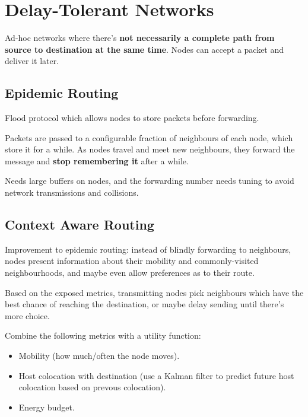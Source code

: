 \documentclass[a4paper, 11pt]{article}
\begin{document}
\section*{Delay-Tolerant Networks}
{
    Ad-hoc networks where there's \textbf{not necessarily a complete path from source to destination at the same time}. Nodes can accept a packet and deliver it later.

    \subsection*{Epidemic Routing}
    {
        Flood protocol which allows nodes to store packets before forwarding.

        Packets are passed to a configurable fraction of neighbours of each node, which store it for a while. As nodes travel and meet new neighbours, they forward the message and \textbf{stop remembering it} after a while.

        Needs large buffers on nodes, and the forwarding number needs tuning to avoid network transmissions and collisions.
    }
    \subsection*{Context Aware Routing}
    {
        Improvement to epidemic routing: instead of blindly forwarding to neighbours, nodes present information about their mobility and commonly-visited neighbourhoods, and maybe even allow preferences as to their route.

        Based on the exposed metrics, transmitting nodes pick neighbours which have the best chance of reaching the destination, or maybe delay sending until there's more choice.

        Combine the following metrics with a utility function:
        \begin{itemize}
        \item Mobility (how much/often the node moves).
        \item Host colocation with destination (use a Kalman filter to predict future host colocation based on prevous colocation).
        \item Energy budget.
        \end{itemize}
    }
}
\end{document}
